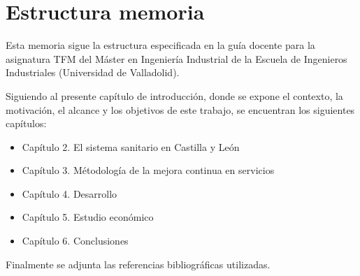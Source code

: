 \section{Estructura memoria}

Esta memoria sigue la estructura especificada en la guía docente para la asignatura TFM del Máster en Ingeniería Industrial de la Escuela de Ingenieros Industriales (Universidad de Valladolid).

Siguiendo al presente capítulo de introducción, donde se expone el contexto, la motivación, el alcance y los objetivos de este trabajo, se encuentran los siguientes capítulos:

\begin{itemize}
    \item Capítulo 2. El sistema sanitario en Castilla y León
    \item Capítulo 3. Métodología de la mejora continua en servicios
    \item Capítulo 4. Desarrollo
    \item Capítulo 5. Estudio económico
    \item Capítulo 6. Conclusiones
\end{itemize}

Finalmente se adjunta las referencias bibliográficas utilizadas.
